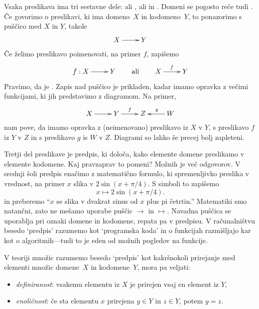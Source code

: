 Vsaka preslikava ima tri sestavne dele:  ali ,
 ali  in . Domeni se pogosto reče tudi
. Če govorimo o preslikavi, ki ima domeno~$X$ in kodomeno~$Y$, to
ponazorimo s puščico med $X$ in $Y$, takole
%
\begin{equation*}
  \xymatrix{
    {X} \ar[r] &
    {Y}
  }
\end{equation*}
%
Če želimo preslikavo poimenovati, na primer $f$, zapišemo
%
\begin{equation*}
  \xymatrix{
   {f : X} \ar[r] &
    {Y}
  }
  \qquad\text{ali}\qquad
  \xymatrix{
   {X} \ar[r]^{f} &
   {Y}
  }
\end{equation*}
%
Pravimo, da je . Zapis nad puščico je prikladen, kadar
imamo opravka z večimi funkcijami, ki jih predstavimo z diagramom. Na primer,
%
\begin{equation*}
  \xymatrix{
    {X} \ar[r] &
    {Y} \ar[r]^{f} &
    {Z}  &
    {W} \ar[l]_{g}
  }
\end{equation*}
%
nam pove, da imamo opravka z (neimenovano) preslikavo iz $X$ v $Y$, s preslikavo $f$ iz
$Y$ v $Z$ in s preslikavo $g$ is $W$ v $Z$. Diagrami so lahko še precej bolj zapleteni.

Tretji del preslikave je predpis, ki določa, kako elemente domene preslikamo v elemente
kodomene. Kaj pravzaprav to pomeni? Možnih je več odgovorov. V srednji šoli predpis
enačimo z matematično formulo, ki spremenljivko preslika v vrednost, na primer $x$ slika v
$2 \sin(x + \pi/4)$. S simboli to zapišemo
%
\begin{equation*}
  x \mapsto 2 \sin(x + \pi/4).
\end{equation*}
%
in preberemo ``$x$ se slika v dvakrat sinus od $x$ plus pi četrtin.''
%
Matematiki smo natančni, zato ne mešamo uporabe puščic $\to$ in $\mapsto$. Navadna puščica
se uporablja pri oznaki domene in kodomene, repata pa v predpisu. V računalništvu besedo
`predpis' razumemo kot `programska koda' in o funkcijah razmišljajo kar kot o
algoritmih---tudi to je eden od možnih pogledov na funkcije.

V teoriji množic razumemo besedo `predpis' kot kakršnokoli prirejanje med elementi množic
domene~$X$ in kodomene~$Y$, mora pa veljati:
%
\begin{itemize}
\item \emph{definiranost}: vsakemu elementu iz $X$ je prirejen vsaj en element iz $Y$,
\item \emph{enoličnost}: če sta elementu $x$ prirejena $y \in Y$ in $z \in Y$, potem $y = z$.
\end{itemize}


